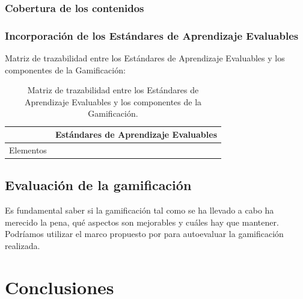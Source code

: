 \documentclass[a4paper, 12pt]{book}
\begin{document}
\subsection{Cobertura de los contenidos}
\subsection{Incorporación de los Estándares de Aprendizaje Evaluables}

Matriz de trazabilidad entre los Estándares de Aprendizaje Evaluables y los componentes de la Gamificación:
\begin{table}[hbtp]
\caption{Matriz de trazabilidad entre los Estándares de Aprendizaje Evaluables y los componentes de la Gamificación.}
\label{Trazabilidad}
\begin{tabular}{c|c}
& Estándares de Aprendizaje Evaluables\\\hline
Elementos & \\\hline
\end{tabular}
\end{table}


\section{Evaluación de la gamificación}

Es fundamental saber si la gamificación tal como se ha llevado a cabo ha merecido la pena, qué aspectos son mejorables y cuáles hay que mantener.
%
Podríamos utilizar el marco propuesto por \cite{EvaluacionGamificacion} para autoevaluar la gamificación realizada.



\cleardoublepage
\chapter{Conclusiones}
\label{chap:conclusiones}



\label{sec:trabajos_futuros}
\end{document}
